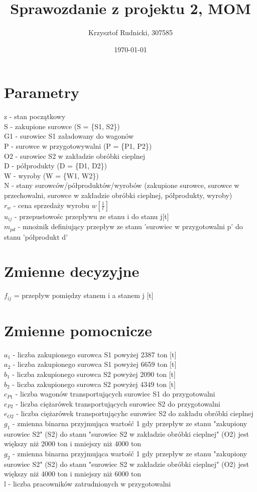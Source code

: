 \documentclass[12pt]{article}
\title{Sprawozdanie z projektu 2, MOM}
\author{Krzysztof Rudnicki, 307585}
\date{\today}
\begin{document}
\maketitle
\section{Parametry}
z - stan początkowy \\
S - zakupione surowce (S = \{S1, S2\}) \\
G1 - surowiec S1 załadowany do wagonów \\
P - surowce w przygotowywalni (P = \{P1, P2\}) \\
O2 - surowiec S2 w zakładzie obróbki cieplnej \\
D - półprodukty (D = \{D1, D2\}) \\ 
W - wyroby (W = \{W1, W2\}) \\
N - stany surowców/półproduktów/wyrobów (zakupione surowce, surowce w przechowalni, surowce w zakładzie obróbki cieplnej, półprodukty, wyroby) \\ 
$r_w$ - cena sprzedaży wyrobu $w[\frac{1}{t}]$ \\
$u_{ij}$ - przepustowośc przepływu ze stanu i do stanu j[t] \\ 
$m_{pd}$ - mnożnik definiujący przepływ ze stanu 'surowiec w przygotowalni p' do stanu 'półprodukt d'

\section{Zmienne decyzyjne}
$f_{ij}$ = przepływ pomiędzy stanem i a stanem j [t] \\ 
\section{Zmienne pomocnicze}
$a_1$ - liczba zakupionego surowca S1 powyżej 2387 ton [t] \\
$a_2$ - liczba zakupionego surowca S1 powyżej 6659 ton [t] \\
$b_1$ - liczba zakupionego surowca S2 powyżej 2090 ton [t] \\
$b_2$ - liczba zakupionego surowca S2 powyżej 4349 ton [t] \\
$c_{P1}$ - liczba wagonów transportujących surowiec S1 do przygotowalni \\ 
$e_{P2}$ - liczba ciężarówek transportujących surowiec S2 do przygotowalni \\
$e_{O2}$ - liczba ciężarówek transportującyhc surowiec S2 do zakładu obróbki cieplnej \\
$g_1$ - zmienna binarna przyjmująca wartość 1 gdy przepływ ze stanu "zakupiony surowiec S2" (S2) do stanu "surowiec S2 w zakładzie obróbki cieplnej" (O2) jest większy niż 2000 ton i mniejszy niż 4000 ton \\ 
$g_2$ - zmienna binarna przyjmująca wartość 1 gdy przepływ ze stanu "zakupiony surowiec S2" (S2) do stanu "surowiec S2 w zakładzie obróbki cieplnej" (O2) jest większy niż 4000 ton i mniejszy niż 6000 ton \\
l - liczba pracowników zatrudnionych w przygotowalni
\end{document}
